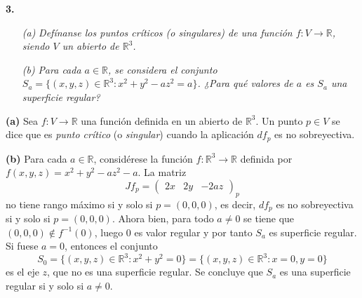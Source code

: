 \documentclass[12pt]{report}
\newcommand{\R}{\mathbb R}
\begin{document}
\vspace{4mm}
\textbf{3. } 
\begin{itemize}
    \item[\textit{(a)}] \textit{Defínanse los puntos críticos (o singulares) de una función $f \colon V \to \R$, siendo $V$ un abierto de $\R^3$.}
    \item[\textit{(b)}] \textit{Para cada $a \in \R$, se considera el conjunto $S_a = \{(x,y,z) \in \R^3 \colon x^2+y^2-az^2 = a\}$. ¿Para qué valores de $a$ es $S_a$ una superficie regular?}
\end{itemize}

\textbf{(a) } Sea $f \colon V \to \R$ una función definida en un abierto de $\R^3$. Un punto $p \in V$ se dice que es \textit{punto crítico} (o \textit{singular}) cuando la aplicación $df_p$ es no sobreyectiva.

\vspace{2mm}
\textbf{(b) } Para cada $a \in \R$, considérese la función $f \colon \R^3 \to \R$ definida por $f(x,y,z) = x^2+y^2-az^2-a$. La matriz
\[Jf_p = \begin{pmatrix}
    2x & 2y & -2az
\end{pmatrix}_p\]
no tiene rango máximo si y solo si $p = (0,0,0)$, es decir, $df_p$ es no sobreyectiva si y solo si $p = (0,0,0)$. Ahora bien, para todo $a \neq 0$ se tiene que $(0,0,0) \notin f^{-1}(0)$, luego $0$ es valor regular y por tanto $S_a$ es superficie regular. Si fuese $a = 0$, entonces el conjunto
\[S_0 = \{(x,y,z) \in \R^3 \colon x^2+y^2 = 0\} = \{(x,y,z) \in \R^3 \colon x = 0, y = 0\}\]
es el eje $z$, que no es una superficie regular. Se concluye que $S_a$ es una superficie regular si y solo si $a \neq 0$.
\end{document}

